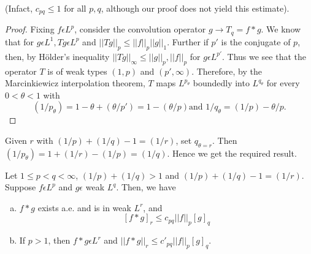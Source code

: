 (In\pageoriginale fact, $c_{pq} \le 1$ for all $p, q$, although our
proof does not yield this estimate).
 
\begin{proof}%
  Fixing $f \epsilon L^p$, consider the convolution operator $g \to
  T_q = f * g$. We know that for $g \epsilon L^1, Tg \epsilon L^p$
  and $|| Tg ||_p \le || f ||_p || g ||_1$. Further if $p'$ is the
  conjugate of $p$, then, by H\"{o}lder's inequality $|| Tg ||_{\infty}
  \le || g ||_p, || f ||_p$ for $g \epsilon L^{p'}$. Thus we see that
  the operator $T $ is of weak types $(1, p)$ and $(p',
  \infty)$. Therefore, by the Marcinkiewicz interpolation theorem, $T$
  maps $L^{p_{\theta}}$ boundedly into $L^{q_{\theta}}$ for every $0 <
  \theta < 1$ with 
  $$
  (1/p_{\theta}) = 1 - \theta + (\theta/p') = 1 -  (\theta/p) \text{
    and } 1/q_{\theta} = (1/p) - \theta/p. 
  $$ 
\end{proof}

Given $r$ with $(1/p) + (1/q) - 1 =  (1/r)$, set $q_{\theta =
  r}$. Then $(1/p_{\theta})  = 1 +  (1/r) - (1/p) = (1/q)$. Hence we
get the required result. 

\setcounter{thm}{13}
\begin{thm}\label{chap5:thm5.14} 
  Let $1 \le p < q < \infty$,
  $(1/p) + (1/q) > 1$ and  $(1/p) + (1/q) - 1 = (1/r)$. 
  Suppose $f \epsilon L^p$ and $g \epsilon $ weak
  $L^q$. Then, we have 
  \begin{enumerate}[a)]
  \item $f * g$ exists a.e. and is in weak $L^r$, and
    $$
    [f * g ]_r \le c_{pq} || f ||_p [g]_q
    $$
  \item If $p > 1$, then $f * g \epsilon L^r$ and $||f * g ||_r \le
    c'_{pq} || f ||_p [g]_q$. 
  \end{enumerate}
\end{thm}

